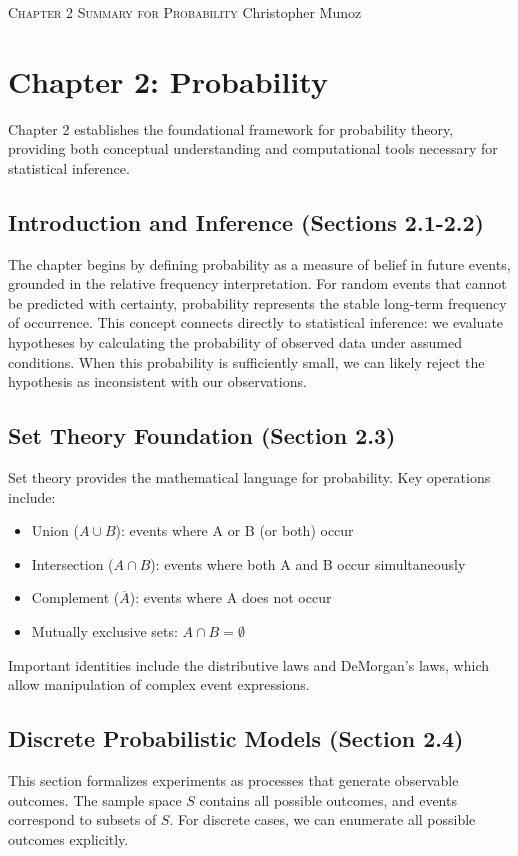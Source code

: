 \documentclass[12pt]{article}
\begin{document}
\small
\noindent \textsc{Chapter 2 Summary for Probability} \hfill Christopher Munoz
\normalsize
\bigskip

\section*{Chapter 2: Probability}

Chapter 2 establishes the foundational framework for probability theory, providing both conceptual understanding and computational tools necessary for statistical inference.

\subsection*{Introduction and Inference (Sections 2.1-2.2)}
The chapter begins by defining probability as a measure of belief in future events, grounded in the relative frequency interpretation. For random events that cannot be predicted with certainty, probability represents the stable long-term frequency of occurrence. This concept connects directly to statistical inference: we evaluate hypotheses by calculating the probability of observed data under assumed conditions. When this probability is sufficiently small, we can likely reject the hypothesis as inconsistent with our observations.

\subsection*{Set Theory Foundation (Section 2.3)}
Set theory provides the mathematical language for probability. Key operations include:
\begin{itemize}
\item Union ($A \cup B$): events where A or B (or both) occur
\item Intersection ($A \cap B$): events where both A and B occur simultaneously  
\item Complement ($\overline{A}$): events where A does not occur
\item Mutually exclusive sets: $A \cap B = \emptyset$
\end{itemize}

Important identities include the distributive laws and DeMorgan's laws, which allow manipulation of complex event expressions.

\subsection*{Discrete Probabilistic Models (Section 2.4)}
This section formalizes experiments as processes that generate observable outcomes. The sample space $S$ contains all possible outcomes, and events correspond to subsets of $S$. For discrete cases, we can enumerate all possible outcomes explicitly.
\end{document}
